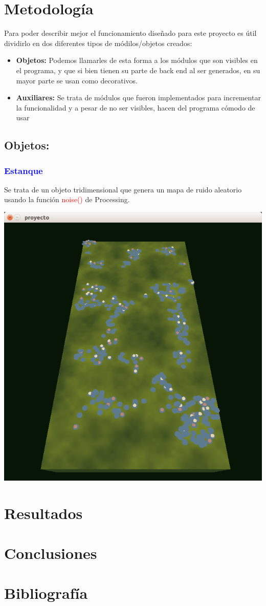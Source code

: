 \documentclass[11pt,a4paper]{article}
\begin{document}
\section{Metodología}
	Para poder describir mejor el funcionamiento diseñado para este proyecto es útil dividirlo en dos diferentes tipos de módilos/objetos creados:
	\begin{itemize}
	\item {\bf Objetos:} Podemos llamarles de esta forma a los módulos que son visibles en el programa, y que si bien tienen su parte de back end al ser generados, en su mayor parte se usan como decorativos.
	\item { \bf Auxiliares: } Se trata de módulos que fueron implementados para incrementar la funcionalidad y a pesar de no ser visibles, hacen del programa cómodo de usar
	\end{itemize}
	\subsection{Objetos: }
		\subsubsection{\textcolor{blue}{Estanque}}
			Se trata de un objeto tridimensional que genera un mapa de ruido aleatorio usando la función \textcolor{red}{noise()} de Processing. 

			\begin{center}
			\includegraphics[scale=.5]{CAP1}
			\end{center}




\section{Resultados}
\section{Conclusiones}
\section{Bibliografía}


 	
\end{document}
